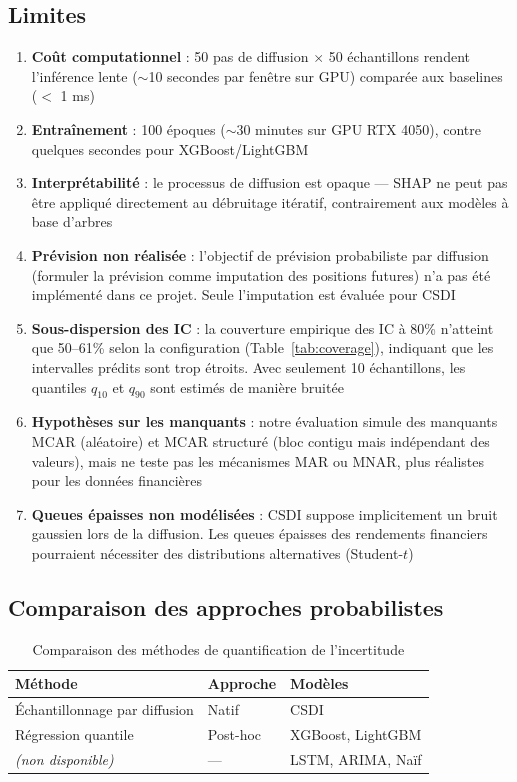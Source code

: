 \documentclass[12pt,a4paper]{article}
\begin{document}
\subsection{Limites}

\begin{enumerate}
    \item \textbf{Co\^ut computationnel} : 50 pas de diffusion $\times$ 50 \'echantillons rendent l'inf\'erence lente ($\sim$10 secondes par fen\^etre sur GPU) compar\'ee aux baselines ($<$ 1 ms)
    \item \textbf{Entra\^inement} : 100 \'epoques ($\sim$30 minutes sur GPU RTX 4050), contre quelques secondes pour XGBoost/LightGBM
    \item \textbf{Interpr\'etabilit\'e} : le processus de diffusion est opaque --- SHAP ne peut pas \^etre appliqu\'e directement au d\'ebruitage it\'eratif, contrairement aux mod\`eles \`a base d'arbres
    \item \textbf{Pr\'evision non r\'ealis\'ee} : l'objectif de pr\'evision probabiliste par diffusion (formuler la pr\'evision comme imputation des positions futures) n'a pas \'et\'e impl\'ement\'e dans ce projet. Seule l'imputation est \'evalu\'ee pour CSDI
    \item \textbf{Sous-dispersion des IC} : la couverture empirique des IC \`a 80\% n'atteint que 50--61\% selon la configuration (Table~\ref{tab:coverage}), indiquant que les intervalles pr\'edits sont trop \'etroits. Avec seulement 10 \'echantillons, les quantiles $q_{10}$ et $q_{90}$ sont estim\'es de mani\`ere bruit\'ee
    \item \textbf{Hypoth\`eses sur les manquants} : notre \'evaluation simule des manquants MCAR (al\'eatoire) et MCAR structur\'e (bloc contigu mais ind\'ependant des valeurs), mais ne teste pas les m\'ecanismes MAR ou MNAR, plus r\'ealistes pour les donn\'ees financi\`eres
    \item \textbf{Queues \'epaisses non mod\'elis\'ees} : CSDI suppose implicitement un bruit gaussien lors de la diffusion. Les queues \'epaisses des rendements financiers pourraient n\'ecessiter des distributions alternatives (Student-$t$)
\end{enumerate}

\subsection{Comparaison des approches probabilistes}

\begin{table}[H]
\centering
\caption{Comparaison des m\'ethodes de quantification de l'incertitude}
\begin{tabular}{lll}
\toprule
\textbf{M\'ethode} & \textbf{Approche} & \textbf{Mod\`eles} \\
\midrule
\'Echantillonnage par diffusion & Natif & CSDI \\
R\'egression quantile & Post-hoc & XGBoost, LightGBM \\
\textit{(non disponible)} & --- & LSTM, ARIMA, Na\"if \\
\bottomrule
\end{tabular}
\end{table}
\end{document}
